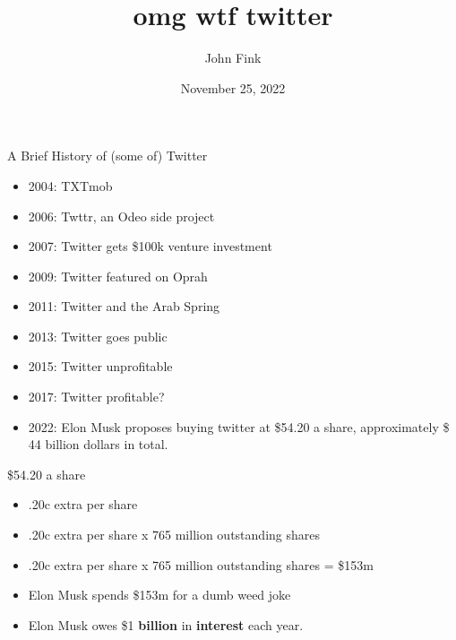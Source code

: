 \documentclass{beamer}
\title{omg wtf twitter}
\author{John Fink}
\date{November 25, 2022}
\begin{document}
\begin{frame}[plain]
    \maketitle
\end{frame}
\begin{frame}{A Brief History of (some of) Twitter}
	\begin{itemize}
		\pause
		\item 2004: TXTmob
		\pause
		\item 2006: Twttr, an Odeo side project
		\pause
		\item 2007: Twitter gets \$100k venture investment
		\pause
		\item 2009: Twitter featured on Oprah
		\pause
		\item 2011: Twitter and the Arab Spring
		\pause
		\item 2013: Twitter goes public
		\pause 
		\item 2015: Twitter unprofitable
		\pause
		\item 2017: Twitter profitable?
		\pause
		\item 2022: Elon Musk proposes buying twitter at \$54.20 a share, approximately \$ 44 billion dollars in total.
	\end{itemize}
\end{frame}

\begin{frame}{\$54.20 a share}
	\begin{itemize}
		\pause
		\item .20c extra per share
		\pause
		\item .20c extra per share x 765 million outstanding shares
		\pause
		\item .20c extra per share x 765 million outstanding shares = \$153m
		\pause
		\item Elon Musk spends \$153m for a dumb weed joke
		\pause 
		\item Elon Musk owes \$1 \textbf{billion} in \textbf{interest} each year.
	\end{itemize}	
\end{frame}
\end{document}
